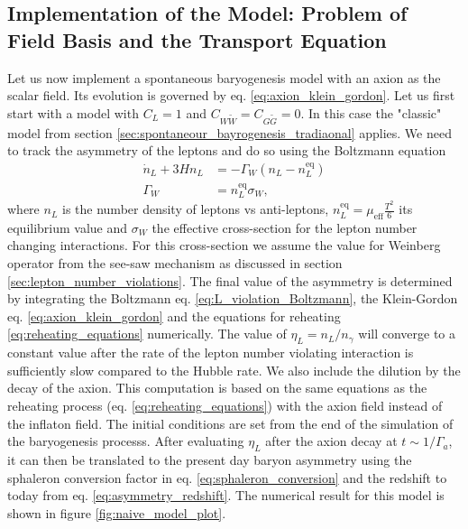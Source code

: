 \documentclass[13pt,a4paper,titlepage]{article}
\begin{document}
\subsection{Implementation of the Model: Problem of Field Basis and the Transport Equation}
\label{sec:model}

Let us now implement a spontaneous baryogenesis model with an axion as the scalar field.
Its evolution is governed by eq. \eqref{eq:axion_klein_gordon}.
Let us first start with a model with $C_L = 1$ and $C_{W \tilde{W}} = C_{G \tilde{G}} = 0$.
In this case the "classic" model from section \ref{sec:spontaneour_bayrogenesis_tradiaonal} applies.
We need to track the asymmetry of the leptons and do so using the Boltzmann equation \cite[eq. 7]{Axion_leptogenesis_Kusenko_2015}
\begin{align}
    \label{eq:L_violation_Boltzmann}
    \dot{n}_L + 3 H n_L &= - \Gamma_W (n_L - n_L^\mathrm{eq}) \\
    \Gamma_W &= n^\mathrm{eq}_L \sigma_W,
\end{align}
where $n_L$ is the number density of leptons vs anti-leptons, $n_L^\mathrm{eq} = \mu_\mathrm{eff} \frac{T^2}{6}$ its equilibrium value and $\sigma_W$ the effective cross-section for the lepton number
changing interactions. For this cross-section we assume the value for Weinberg operator from the see-saw mechanism as discussed in section \ref{sec:lepton_number_violations}.
The final value of the asymmetry is determined by integrating the Boltzmann eq. \eqref{eq:L_violation_Boltzmann}, the Klein-Gordon eq. \eqref{eq:axion_klein_gordon} and the
equations for reheating \eqref{eq:reheating_equations} numerically.
The value of $\eta_L = n_L / n_\gamma$ will converge to
a constant value after the rate of the lepton number violating interaction is sufficiently slow compared to the Hubble rate.
We also include the dilution by the decay of the axion. This computation is based on the same equations
as the reheating process (eq. \eqref{eq:reheating_equations}) with the axion field instead of the
inflaton field. The initial conditions are set from the end of the simulation of the baryogenesis
processs.
After evaluating $\eta_L$ after the axion decay at $t \sim 1/\Gamma_a$, it can then be translated to
the present day baryon asymmetry using the sphaleron conversion factor in eq. \eqref{eq:sphaleron_conversion} and the redshift to today from eq. \eqref{eq:asymmetry_redshift}.
The numerical result for this model is shown in figure \ref{fig:naive_model_plot}.
\end{document}
